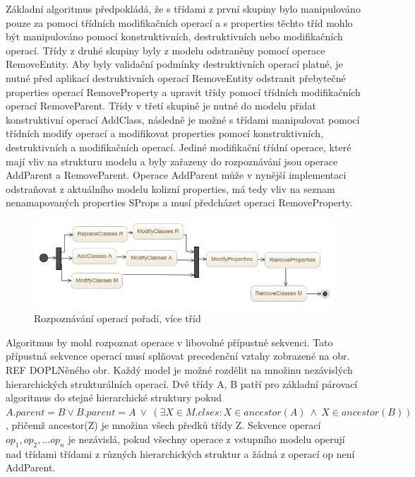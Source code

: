 \documentclass[11pt,twoside,a4paper]{book}
\begin{document}
Základní algoritmus předpokládá, že s třídami z první skupiny bylo manipulováno
pouze za pomoci třídních modifikačních operací a s
properties těchto tříd mohlo být manipulováno pomocí konstruktivních,
destruktivních nebo modifikačních operací. Třídy z druhé skupiny byly z modelu
odstraněny pomocí operace RemoveEntity. Aby byly validační podmínky
destruktivních operací platné, je nutné před aplikací destruktivních operací
RemoveEntity odstranit přebytečné properties operací RemoveProperty a upravit
třídy pomocí třídních modifikačních operací RemoveParent. Třídy v třetí skupině
je nutné do modelu přidat konstruktivní operací AddClass, následně je možné s
třídami manipulovat pomocí třídních modify operací a modifikovat properties
pomocí konstruktivních, destruktivních a modifikačních operací.
Jediné modifikační třídní operace, které mají vliv na strukturu modelu a byly
zařazeny do rozpoznávání jsou operace AddParent a RemoveParent. Operace
AddParent může v nynější implementaci odstraňovat z aktuálního modelu
kolizní properties, má tedy vliv na seznam nenamapovaných properties SProps a
musí předcházet operaci RemoveProperty. 
\\
\begin{figure}[H]
\begin{center}
\includegraphics[width=15cm]{figures/recognition_order_basic2.jpg}
\caption{Rozpoznávání operací pořadí, více tříd}
\label{fig:recog_ops_order2}
\end{center}
\end{figure}
\FloatBarrier

 Algoritmus by mohl rozpoznat operace v libovolné přípustné sekvenci. Tato
 přípustná sekvence operací musí splňovat precedenční vztahy zobrazené na obr.
 REF DOPLNěného obr. Každý model je možné rozdělit na množinu nezávislých
 hierarchických strukturálních operací. Dvě třídy A, B patří pro základní
 párovací algoritmus do stejné hierarchické struktury pokud $A.parent = B \vee
 B.parent = A \ \vee \ (\exists X \in M.clses: X \in ancestor(A)\ \wedge\ X \in
 ancestor(B))$, přičemž ancestor(Z) je množina všech předků třídy Z. Sekvence
 operací $op_1, op_2, \ldots op_n$ je nezávislá, pokud všechny operace z
 vstupního modelu operují nad třídami třídami z různých hierarchických struktur
  a žádná z operací op není AddParent. 
  
\end{document}
